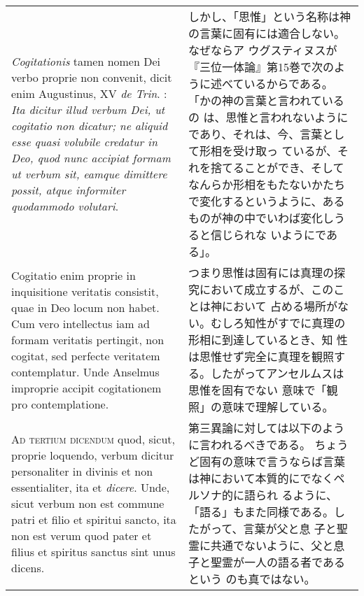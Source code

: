 \documentclass[10pt]{jsarticle} %
\begin{document}
\begin{longtable}{p{21em}p{21em}}
\\


{\itshape Cogitationis} tamen nomen Dei verbo proprie non convenit, dicit
 enim Augustinus, XV {\itshape de Trin}. : {\itshape Ita dicitur illud verbum Dei, ut
 cogitatio non dicatur; ne aliquid esse quasi volubile credatur in
 Deo, quod nunc accipiat formam ut verbum sit, eamque dimittere
 possit, atque informiter quodammodo volutari}. 

&

しかし、「思惟」という名称は神の言葉に固有には適合しない。なぜならア
 ウグスティヌスが『三位一体論』第15巻で次のように述べているからである。
「かの神の言葉と言われているの
 は、思惟と言われないようにであり、それは、今、言葉として形相を受け取っ
 ているが、それを捨てることができ、そしてなんらか形相をもたないかたち
 で変化するというように、あるものが神の中でいわば変化しうると信じられな
 いようにである」。



\\



Cogitatio enim proprie
 in inquisitione veritatis consistit, quae in Deo locum non habet. Cum
 vero intellectus iam ad formam veritatis pertingit, non cogitat, sed
 perfecte veritatem contemplatur. Unde Anselmus improprie accipit
 cogitationem pro contemplatione.

&

つまり思惟は固有には真理の探究において成立するが、このことは神において
 占める場所がない。むしろ知性がすでに真理の形相に到達しているとき、知
 性は思惟せず完全に真理を観照する。したがってアンセルムスは思惟を固有でない
 意味で「観照」の意味で理解している。

\\




{\scshape Ad tertium dicendum} quod, sicut, proprie loquendo, verbum dicitur
 personaliter in divinis et non essentialiter, ita et {\itshape dicere}. Unde,
 sicut verbum non est commune patri et filio et spiritui sancto, ita
 non est verum quod pater et filius et spiritus sanctus sint unus
 dicens. 

&

第三異論に対しては以下のように言われるべきである。
ちょうど固有の意味で言うならば言葉は神において本質的にでなくペルソナ的に語られ
るように、「語る」もまた同様である。したがって、言葉が父と息
 子と聖霊に共通でないように、父と息子と聖霊が一人の語る者であるという
 のも真ではない。


\end{longtable}
\end{document}
